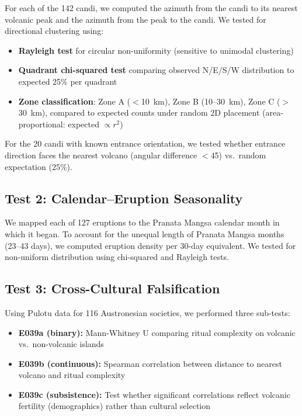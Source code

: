 \documentclass[12pt,a4paper]{article}
\begin{document}
For each of the 142 candi, we computed the azimuth from the candi to its nearest volcanic peak and the azimuth from the peak to the candi. We tested for directional clustering using:
\begin{itemize}
    \item \textbf{Rayleigh test} for circular non-uniformity (sensitive to unimodal clustering)
    \item \textbf{Quadrant chi-squared test} comparing observed N/E/S/W distribution to expected 25\% per quadrant
    \item \textbf{Zone classification}: Zone A ($<$10~km), Zone B (10--30~km), Zone C ($>$30~km), compared to expected counts under random 2D placement (area-proportional: expected $\propto r^2$)
\end{itemize}

For the 20 candi with known entrance orientation, we tested whether entrance direction faces the nearest volcano (angular difference $<$45\textdegree) vs.\ random expectation (25\%).

\subsection{Test 2: Calendar--Eruption Seasonality}
\label{sec:calendar}

We mapped each of 127 eruptions to the Pranata Mangsa calendar month in which it began. To account for the unequal length of Pranata Mangsa months (23--43 days), we computed eruption density per 30-day equivalent. We tested for non-uniform distribution using chi-squared and Rayleigh tests.

\subsection{Test 3: Cross-Cultural Falsification}
\label{sec:crosscultural}

Using Pulotu data for 116 Austronesian societies, we performed three sub-tests:
\begin{itemize}
    \item \textbf{E039a (binary):} Mann-Whitney U comparing ritual complexity on volcanic vs.\ non-volcanic islands
    \item \textbf{E039b (continuous):} Spearman correlation between distance to nearest volcano and ritual complexity
    \item \textbf{E039c (subsistence):} Test whether significant correlations reflect volcanic fertility (demographics) rather than cultural selection
\end{itemize}
\end{document}
